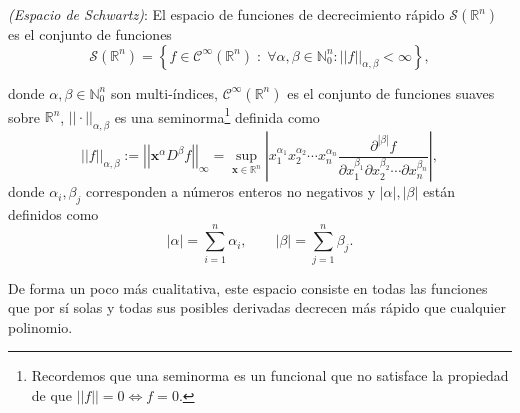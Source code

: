         \begin{definition*}
            \textit{(Espacio de Schwartz)}: El espacio de funciones de decrecimiento rápido $\mathcal{S}(\mathbb{R}^n)$ es el conjunto de funciones
            \begin{equation}
                \mathcal{S}(\mathbb{R}^n) = \left\{ f \in \mathcal{C}^\infty(\mathbb{R}^n)\; : \; \forall \alpha,\beta \in \mathbb{N}_0^n : ||f||_{\alpha,\beta} < \infty \right\},
            \end{equation}
        \end{definition*}
        donde $\alpha,\beta \in \mathbb{N}_0^n$ son multi-índices, $\mathcal{C}^\infty(\mathbb{R}^n)$ es el conjunto de funciones suaves sobre $\mathbb{R}^n$, $||\cdot||_{\alpha,\beta}$ es una seminorma\footnote{Recordemos que una seminorma es un funcional que no satisface la propiedad de que $||f|| = 0 \iff f = 0$.} definida como
        \begin{equation}
            ||f||_{\alpha,\beta} := \left|\left|\mathbf{x}^\alpha D^\beta f \right| \right|_\infty = 
            \sup_{\mathbf{x}\in \mathbb{R}^n}
            \left|x_{1}^{\alpha_1}x_{2}^{\alpha_2}\cdots x_{n}^{\alpha_n} \frac{\partial^{|\beta|}f}{\partial x_{1}^{\beta_1}\partial x_{2}^{\beta_2}\cdots \partial x_{n}^{\beta_n}}  \right|,
        \end{equation}
        donde $\alpha_i,\beta_j$ corresponden a números enteros no negativos y $|\alpha|,|\beta|$ están definidos como
        \begin{equation*}
            |\alpha| = \sum_{i=1}^{n}\alpha_i, \qquad |\beta| = \sum_{j=1}^{n}\beta_j.
        \end{equation*}

        De forma un poco más cualitativa, este espacio consiste en todas las funciones que por sí solas y todas sus posibles derivadas decrecen más rápido que cualquier polinomio.

